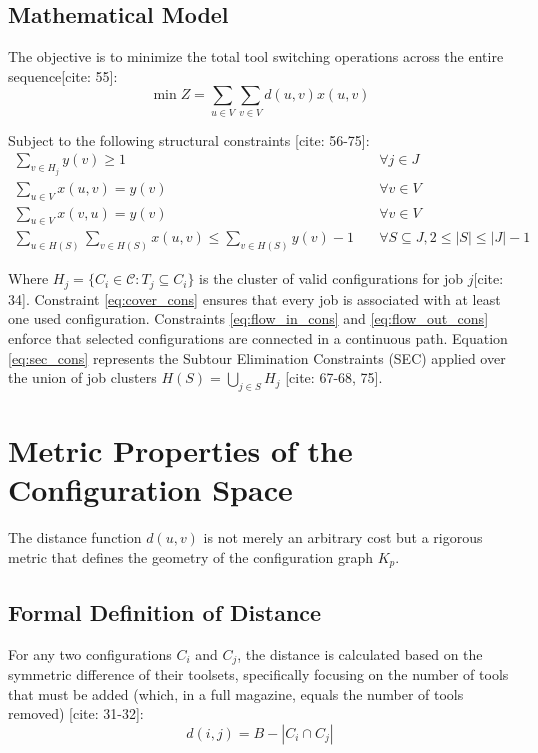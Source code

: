 \documentclass[12pt]{article}
\begin{document}
\subsection{Mathematical Model}
The objective is to minimize the total tool switching operations across the entire sequence[cite: 55]:
\begin{equation}
    \min Z = \sum_{u \in V} \sum_{v \in V} d(u, v) x(u, v)
\end{equation}

Subject to the following structural constraints [cite: 56-75]:
\begin{align}
    \sum_{v \in H_j} y(v) \geq 1 & \quad \forall j \in J \label{eq:cover_cons} \\
    \sum_{u \in V} x(u, v) = y(v) & \quad \forall v \in V \label{eq:flow_in_cons} \\
    \sum_{u \in V} x(v, u) = y(v) & \quad \forall v \in V \label{eq:flow_out_cons} \\
    \sum_{u \in H(S)} \sum_{v \in H(S)} x(u, v) \leq \sum_{v \in H(S)} y(v) - 1 & \quad \forall S \subseteq J, 2 \leq |S| \leq |J|-1 \label{eq:sec_cons}
\end{align}

Where $H_j = \{C_i \in \mathcal{C} : T_j \subseteq C_i\}$ is the cluster of valid configurations for job $j$[cite: 34]. Constraint \eqref{eq:cover_cons} ensures that every job is associated with at least one used configuration. Constraints \eqref{eq:flow_in_cons} and \eqref{eq:flow_out_cons} enforce that selected configurations are connected in a continuous path. Equation \eqref{eq:sec_cons} represents the Subtour Elimination Constraints (SEC) applied over the union of job clusters $H(S) = \bigcup_{j \in S} H_j$ [cite: 67-68, 75].

\section{Metric Properties of the Configuration Space}

The distance function $d(u,v)$ is not merely an arbitrary cost but a rigorous metric that defines the geometry of the configuration graph $K_p$.

\subsection{Formal Definition of Distance}
For any two configurations $C_i$ and $C_j$, the distance is calculated based on the symmetric difference of their toolsets, specifically focusing on the number of tools that must be added (which, in a full magazine, equals the number of tools removed) [cite: 31-32]:
\begin{equation}
    d(i, j) = B - |C_i \cap C_j|
\end{equation}
\end{document}

